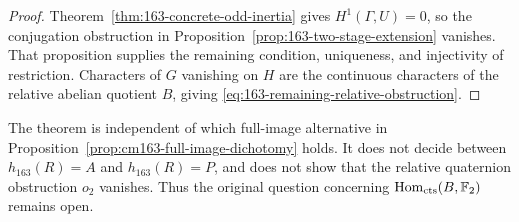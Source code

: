 \begin{proof}
Theorem~\ref{thm:163-concrete-odd-inertia} gives
\(H^1(\Gamma,U)=0\), so the conjugation obstruction in
Proposition~\ref{prop:163-two-stage-extension} vanishes.
That proposition supplies the remaining condition,
uniqueness, and injectivity of restriction.
Characters of \(G\) vanishing on \(H\) are the
continuous characters of the relative abelian quotient
\(B\), giving \eqref{eq:163-remaining-relative-obstruction}.
\end{proof}

The theorem is independent of which full-image
alternative in
Proposition~\ref{prop:cm163-full-image-dichotomy} holds.
It does not decide between \(h_{163}(R)=A\) and
\(h_{163}(R)=P\), and does not show that the relative
quaternion obstruction \(o_2\) vanishes.
Thus the original question concerning
\(\operatorname{Hom}_{\rm cts}(B,\mathbb F_2)\) remains open.
